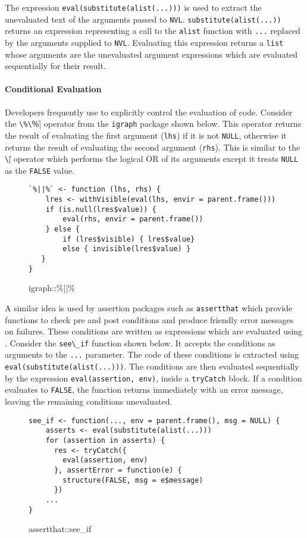 \documentclass[screen,acmsmall]{acmart}%
\newcommand{\code}[1]{\lstinline |#1|\xspace}
\begin{document}
The expression \code{eval(substitute(alist(...)))} is used to extract the
unevaluated text of the arguments passed to \code{NVL}.
\code{substitute(alist(...))} returns an expression representing a call to the
\code{alist} function with \code{...} replaced by the arguments supplied to
\code{NVL}. Evaluating this expression returns a \code{list} whose arguments are
the unevaluated argument expressions which are evaluated sequentially for their
result.

\paragraph{Conditional Evaluation} Developers frequently use \eval to explicitly
control the evaluation of code. Consider the \code{\%\|\|\%} operator from the
\code{igraph} package shown below. This operator returns the result of
evaluating the first argument (\code{lhs}) if it is not \code{NULL}, otherwise
it returns the result of evaluating the second argument (\code{rhs}). This is
similar to the \code{\|\|} operator which performs the logical OR of its
arguments except it treats \code{NULL} as the \code{FALSE} value.

\begin{figure}[h]
\begin{lstlisting}
`%||%` <- function (lhs, rhs) {
    lres <- withVisible(eval(lhs, envir = parent.frame()))
    if (is.null(lres$value)) {
        eval(rhs, envir = parent.frame())
    } else {
        if (lres$visible) { lres$value}
        else { invisible(lres$value) }
   }
}
\end{lstlisting}
  \caption{igraph::\%||\%}
\end{figure}

A similar idea is used by assertion packages such as \code{assertthat} which
provide functions to check pre and post conditions and produce friendly error
messages on failures. These conditions are written as expressions which are
evaluated using \eval. Consider the \code{see\_if} function shown below. It
accepts the conditions as arguments to the \code{...} parameter. The code of
these conditions is extracted using \code{eval(substitute(alist(...)))}. The
conditions are then evaluated sequentially by the expression
\code{eval(assertion, env)}, inside a \code{tryCatch} block. If a condition
evaluates to \code{FALSE}, the function returns immediately with an error
message, leaving the remaining conditions unevaluated.

\begin{figure}[h]
\begin{lstlisting}
see_if <- function(..., env = parent.frame(), msg = NULL) {
    asserts <- eval(substitute(alist(...)))
    for (assertion in asserts) {
      res <- tryCatch({
        eval(assertion, env)
      }, assertError = function(e) {
        structure(FALSE, msg = e$message)
      })
    ...
}
\end{lstlisting}
  \caption{assertthat::see\_if}
\end{figure}
\end{document}
